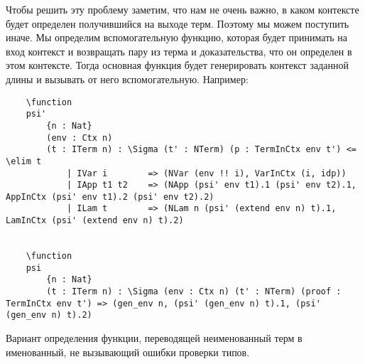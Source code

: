 Чтобы решить эту проблему заметим, что нам не очень важно, в каком контексте будет определен получившийся на выходе терм. Поэтому мы можем поступить иначе. Мы определим вспомогательную функцию, которая будет принимать на вход контекст и возвращать пару из терма и доказательства, что он определен в этом контексте. Тогда основная функция будет генерировать контекст заданной длины и вызывать от него вспомогательную. Например:

\begin{listing}[H]
  \begin{verbatim}
    \function
    psi'
        {n : Nat}
        (env : Ctx n)
        (t : ITerm n) : \Sigma (t' : NTerm) (p : TermInCtx env t') <= \elim t
            | IVar i        => (NVar (env !! i), VarInCtx (i, idp))
            | IApp t1 t2    => (NApp (psi' env t1).1 (psi' env t2).1, AppInCtx (psi' env t1).2 (psi' env t2).2)
            | ILam t        => (NLam n (psi' (extend env n) t).1, LamInCtx (psi' (extend env n) t).2)


    \function
    psi
        {n : Nat}
        (t : ITerm n) : \Sigma (env : Ctx n) (t' : NTerm) (proof : TermInCtx env t') => (gen_env n, (psi' (gen_env n) t).1, (psi' (gen_env n) t).2)
  \end{verbatim}
  \caption{Вариант определения функции, переводящей неименованный терм в именованный, не вызывающий ошибки проверки типов.}
\end{listing}
